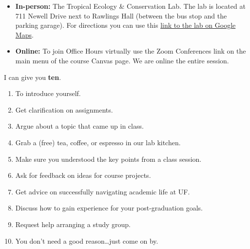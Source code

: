 \documentclass[
  10pt,
  letterpaper,
  oneside,
  open=any]{scrbook}
\providecommand{\tightlist}{%
  \setlength{\itemsep}{0pt}\setlength{\parskip}{0pt}}
\begin{document}
\begin{itemize}
\item
  \textbf{In-person:} The Tropical Ecology \& Conservation Lab. The lab
  is located at 711 Newell Drive next to Rawlings Hall (between the bus
  stop and the parking garage). For directions you can use this
  \href{https://maps.app.goo.gl/xo13vJmj8WXAivpZ9}{link to the lab on
  Google Maps}.
\item
  \textbf{Online:} To join Office Hours virtually use the Zoom
  Conferences link on the main menu of the course Canvas page. We are
  online the entire session.
\end{itemize}

\begin{tcolorbox}[enhanced jigsaw, bottomtitle=1mm, colback=white, colbacktitle=quarto-callout-tip-color!10!white, arc=.35mm, leftrule=.75mm, coltitle=black, colframe=quarto-callout-tip-color-frame, bottomrule=.15mm, breakable, toprule=.15mm, rightrule=.15mm, titlerule=0mm, title=\textcolor{quarto-callout-tip-color}{\faLightbulb}\hspace{0.5em}{Can you give me \textbf{one good reason} why I should go to Office
Hours?}, toptitle=1mm, left=2mm, opacitybacktitle=0.6, opacityback=0]

I can give you \textbf{ten}.

\begin{enumerate}
\def\labelenumi{\arabic{enumi}.}
\tightlist
\item
  To introduce yourself.
\item
  Get clarification on assignments.
\item
  Argue about a topic that came up in class.
\item
  Grab a (free) tea, coffee, or espresso in our lab kitchen.
\item
  Make sure you understood the key points from a class session.
\item
  Ask for feedback on ideas for course projects.
\item
  Get advice on successfully navigating academic life at UF.
\item
  Discuss how to gain experience for your post-graduation goals.
\item
  Request help arranging a study group.
\item
  You don't need a good reason\ldots just come on by.
\end{enumerate}

\end{tcolorbox}
\end{document}

